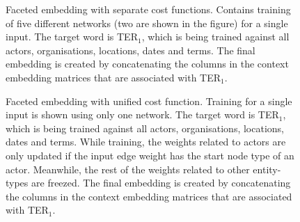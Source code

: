 \begin{figure}
{\small 
{} %

}
\caption{Faceted embedding with separate cost functions. Contains training of five different networks (two are shown in the figure) for a single input. The target word is TER$_1$, which is being trained against all actors, organisations, locations, dates and terms. The final embedding is created by concatenating the columns in the context embedding matrices that are associated with TER$_1$.} \label{fig:separate_cost}
\end{figure}
\begin{figure}
{\small 
{} %

\caption{Faceted embedding with unified cost function. Training for a single input is shown using only one network. The target word is TER$_1$, which is being trained against all actors, organisations, locations, dates and terms. While training, the weights related to actors are only updated if the input edge weight has the start node type of an actor. Meanwhile, the rest of the weights related to other entity-types are freezed. The final embedding is created by concatenating the columns in the context embedding matrices that are associated with TER$_1$.} \label{fig:unified_cost}
}
\end{figure}
